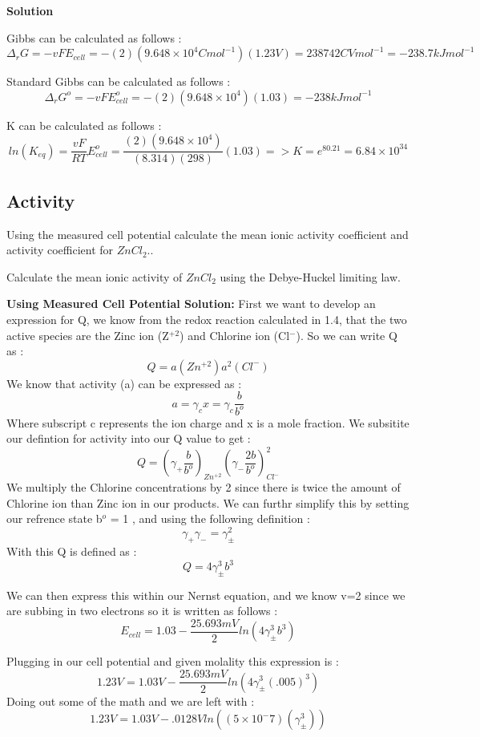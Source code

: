 \documentclass{article}
\newcommand{\be}{\begin{equation}}
\newcommand{\ee}{\end{equation}}
\begin{document}
\bigskip

\textbf{Solution}
\bigskip

Gibbs can be calculated as follows : 
\be
\Delta_r G = -vFE_{cell} = -(2)(9.648 \times 10^4 Cmol^{-1})(1.23V)= 238742 {CVmol^{-1}} =  - 238.7 kJmol^{-1} 
\ee

Standard Gibbs can be calculated as follows : 
\be
\Delta_r G^o = -vFE^o_{cell}= -(2)(9.648 \times 10^4)(1.03) = -238 kJmol^{-1}
\ee

K can be calculated as follows : 
\be
ln(K_{eq}) = \frac{vF}{RT}E^o_{cell} = \frac{(2)(9.648 \times 10^4)}{(8.314)(298)}(1.03) => K = e^{80.21} = 6.84 \times 10^{34}
\ee

\subsection{Activity}
Using the measured cell potential calculate the mean ionic activity coefficient and activity coefficient for $ZnCl_2$..

Calculate the mean ionic activity of $ZnCl_2$ using the Debye-Huckel limiting law.

\bigskip
\textbf{Using Measured Cell Potential Solution:}
First we want to develop an expression for Q, we know from the redox reaction calculated in 1.4, that the two active species are the Zinc ion (Z$^{+2}$) and Chlorine ion (Cl$^-$). So we can write Q as :
\be
Q=a(Zn^{+2})a^2(Cl^-)
\ee
We know that activity (a) can be expressed as : 
\be
a=\gamma_c x = \gamma_c \frac{b}{b^o}
\ee
Where subscript c represents the ion charge and x is a mole fraction.
We subsitite our defintion for activity into our Q value to get : 
\be
Q= \left(\gamma_+\frac{b}{b^o}\right)_{Zn^{+2}}\left(\gamma_- \frac{2b}{b^o}\right)^2_{Cl^-}
\ee
We multiply the Chlorine concentrations by 2 since there is twice the amount of Chlorine ion than Zinc ion in our products. We can furthr simplify this by setting our refrence state b$^o$ = 1 , and using the following definition : 
\be
\gamma_+ \gamma_- = \gamma^2_{\pm}
\ee
With this Q is defined as : 
\be
Q= 4 \gamma^3_{\pm}b^3
\ee

We can then express this within our Nernst equation, and we know v=2 since we are subbing in two electrons so it is written as follows : 
\be
E_{cell} = 1.03 - \frac{25.693mV}{2}ln(4 \gamma^3_{\pm}b^3)
\ee

Plugging in our cell potential and given molality this expression is : 
\be
1.23V = 1.03V - \frac{25.693mV}{2}ln(4 \gamma^3_{\pm}(.005)^3)
\ee
Doing out some of the math and we are left with : 
\be
1.23V = 1.03V - .0128Vln((5\times 10^-7) (\gamma^3_{\pm}))
\ee
\end{document}
